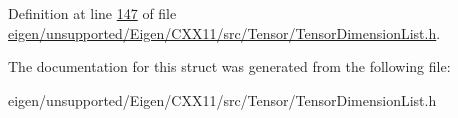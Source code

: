 Definition at line \hyperlink{eigen_2unsupported_2_eigen_2_c_x_x11_2src_2_tensor_2_tensor_dimension_list_8h_source_l00147}{147} of file \hyperlink{eigen_2unsupported_2_eigen_2_c_x_x11_2src_2_tensor_2_tensor_dimension_list_8h_source}{eigen/unsupported/\+Eigen/\+C\+X\+X11/src/\+Tensor/\+Tensor\+Dimension\+List.\+h}.



The documentation for this struct was generated from the following file\+:\begin{DoxyCompactItemize}
\item 
eigen/unsupported/\+Eigen/\+C\+X\+X11/src/\+Tensor/\+Tensor\+Dimension\+List.\+h\end{DoxyCompactItemize}
